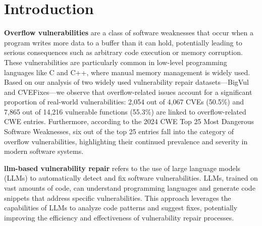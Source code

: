 
\section{Introduction}

\textbf{Overflow vulnerabilities} are a class of software weaknesses that occur when a program writes more data to a buffer than it can hold, potentially leading to serious consequences such as arbitrary code execution or memory corruption. These vulnerabilities are particularly common in low-level programming languages like C and C++, where manual memory management is widely used. Based on our analysis of two widely used vulnerability repair datasets—BigVul\cite{bigvul} and CVEFixes\cite{bhandari2021:cvefixes}—we observe that overflow-related issues account for a significant proportion of real-world vulnerabilities: 2,054 out of 4,067 CVEs (50.5\%) and 7,865 out of 14,216 vulnerable functions (55.3\%) are linked to overflow-related CWE entries. Furthermore, according to the 2024 CWE Top 25 Most Dangerous Software Weaknesses\cite{cwe2024top25}, six out of the top 25 entries fall into the category of overflow vulnerabilities, highlighting their continued prevalence and severity in modern software systems.




\textbf{llm-based vulnerability repair} refers to the use of large language models (LLMs) to automatically detect and fix software vulnerabilities. LLMs, trained on vast amounts of code, can understand programming languages and generate code snippets that address specific vulnerabilities. This approach leverages the capabilities of LLMs to analyze code patterns and suggest fixes, potentially improving the efficiency and effectiveness of vulnerability repair processes.